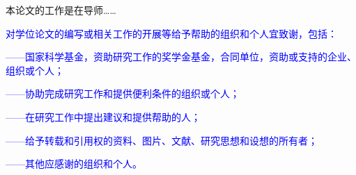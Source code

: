 
\begin{acknowledgements}

本论文的工作是在导师……

\textcolor{blue}{对学位论文的编写或相关工作的开展等给予帮助的组织和个人宜致谢，包括：}

\textcolor{blue}{——国家科学基金，资助研究工作的奖学金基金，合同单位，资助或支持的企业、组织或个人；}

\textcolor{blue}{——协助完成研究工作和提供便利条件的组织或个人；}

\textcolor{blue}{——在研究工作中提出建议和提供帮助的人；}

\textcolor{blue}{——给予转载和引用权的资料、图片、文献、研究思想和设想的所有者；}

\textcolor{blue}{——其他应感谢的组织和个人。}



\end{acknowledgements}

